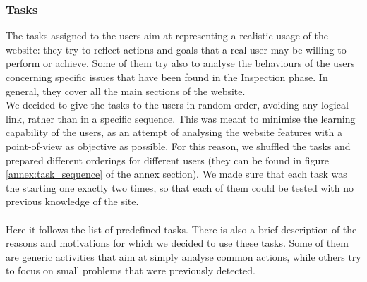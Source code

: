 \documentclass[11pt, letterpaper]{article}
\begin{document}
\subsubsection{Tasks}
The tasks assigned to the users aim at representing a realistic usage of the website: they try to reflect actions and goals that a real user may be willing to perform or achieve. Some of them try also to analyse the behaviours of the users concerning specific issues that have been found in the Inspection phase. In general, they cover all the main sections of the website. \\
We decided to give the tasks to the users in random order, avoiding any logical link, rather than in a specific sequence. This was meant to minimise the learning capability of the users, as an attempt of analysing the website features with a point-of-view as objective as possible. For this reason, we shuffled the tasks and prepared different orderings for different users (they can be found in figure \ref{annex:task_sequence} of the annex section). We made sure that each task was the starting one exactly two times, so that each of them could be tested with no previous knowledge of the site. \\
\\
Here it follows the list of predefined tasks. There is also a brief description of the reasons and motivations for which we decided to use these tasks. Some of them are generic activities that aim at simply analyse common actions, while others try to focus on small problems that were previously detected. \\
\end{document}
